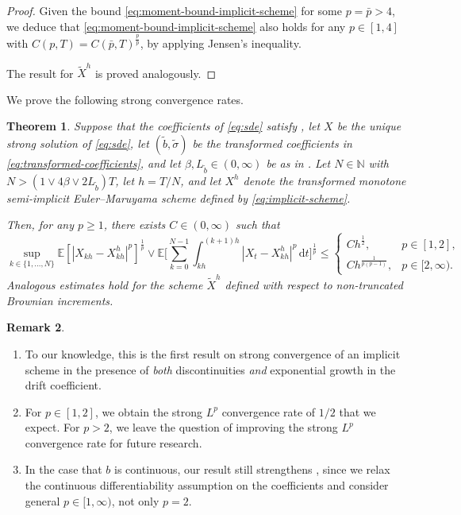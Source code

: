\documentclass[onseside, final]{amsart}
\newtheorem{theorem}{Theorem}[section]
\theoremstyle{definition}
\newtheorem{remark}[theorem]{Remark}
\newcommand{\N}{\mathbb N}
\newcommand{\E}{\mathbb E}
\newcommand{\D}{\,\mathrm{d}}
\numberwithin{equation}{section}
\begin{document}
\begin{proof}
			 Given the bound \eqref{eq:moment-bound-implicit-scheme} for some $p = \bar p > 4$, we deduce that \eqref{eq:moment-bound-implicit-scheme} also holds for any $p \in [1, 4]$ with $C(p, T) = C(\bar p, T)^{\frac{p}{\bar p}}$, by applying Jensen's inequality.
			 
			 The result for $\tilde X^h$ is proved analogously.
		\end{proof}
		
		We prove the following strong convergence rates.
	
		\begin{theorem}\label{thm:implicit-transformed-convergence}
			Suppose that the coefficients of \eqref{eq:sde} satisfy , let $X$ be the unique strong solution of \eqref{eq:sde}, let $(\tilde b, \tilde \sigma)$ be the transformed coefficients in \eqref{eq:transformed-coefficients}, and let $\beta, L_{\tilde b} \in (0, \infty)$ be as in . Let $N \in \N$ with $N > (1 \vee 4\beta \vee 2 L_{\tilde b})T$, let $h = T/N$, and let $X^h$ denote the transformed monotone semi-implicit Euler--Maruyama scheme defined by \eqref{eq:implicit-scheme}.
			
			Then, for any $p \geq 1$, there exists $C \in(0,\infty)$ such that
			\begin{equation}\label{eq:convergence-rate}
				\sup_{k \in \{1, \dotsc, N\}}\mathbb{E}[|X_{kh}- X^h_{kh}|^{p}]^{\frac1p} \vee \E\Biggl[\sum_{k = 0}^{N - 1} \int_{kh}^{(k+1)h}|X_t - X^h_{kh}|^p\D t\Biggr]^{\frac 1p} \le
				\begin{cases}
					C h^{\frac 12}, & p \in [1, 2],\\
					C h^{\frac{1}{p(p - 1)}}, & p \in [2, \infty).
				\end{cases}
			\end{equation}
			Analogous estimates hold for the scheme $\tilde X^h$ defined with respect to non-truncated Brownian increments.
		\end{theorem}
		
		\begin{remark}\label{rem:rates-transformed-implicit}~
			\begin{enumerate}[label = (\roman*)]
				\item To our knowledge, this is the first result on strong convergence of an implicit scheme in the presence of \emph{both} discontinuities \emph{and} exponential growth in the drift coefficient.
				\item For $p \in [1, 2]$, we obtain the strong $L^p$ convergence rate of $1/2$ that we expect. For $p > 2$, we leave the question of improving the strong $L^p$ convergence rate for future research.
				\item In the case that $b$ is continuous, our result still strengthens \citet[Theorem 2.4]{Hu96}, since we relax the continuous differentiability assumption on the coefficients and consider general $p \in [1, \infty)$, not only $p = 2$.
			\end{enumerate}
		\end{remark}
	
\end{document}
